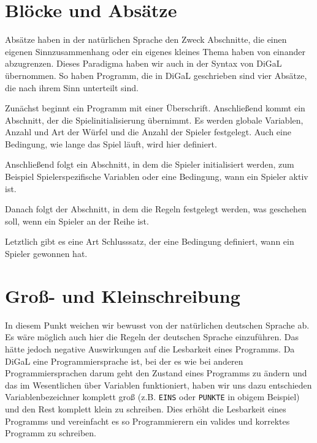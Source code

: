     \section{Blöcke und Absätze}
    \label{sec:blocke_und_absatze}
     Absätze haben in der natürlichen Sprache den Zweck Abschnitte, die einen eigenen Sinnzusammenhang oder ein eigenes kleines Thema haben von einander abzugrenzen. Dieses Paradigma haben wir auch in der Syntax von DiGaL übernommen. So haben Programm, die in DiGaL geschrieben sind vier Absätze, die nach ihrem Sinn unterteilt sind.
 
     Zunächst beginnt ein Programm mit einer Überschrift. Anschließend kommt ein Abschnitt, der die Spielinitialisierung übernimmt. Es werden globale Variablen, Anzahl und Art der Würfel und die Anzahl der Spieler festgelegt. Auch eine Bedingung, wie lange das Spiel läuft, wird hier definiert.
 
     Anschließend folgt ein Abschnitt, in dem die Spieler initialisiert werden, zum Beispiel Spielerspezifische Variablen oder eine Bedingung, wann ein Spieler aktiv ist.
 
     Danach folgt der Abschnitt, in dem die Regeln festgelegt werden, was geschehen soll, wenn ein Spieler an der Reihe ist.
 
     Letztlich gibt es eine Art Schlusssatz, der eine Bedingung definiert, wann ein Spieler gewonnen hat.
 
    \section{Groß- und Kleinschreibung}
    \label{sec:gross_und_kleinschreibung}
     In diesem Punkt weichen wir bewusst von der natürlichen deutschen Sprache ab. Es wäre möglich auch hier die Regeln der deutschen Sprache einzuführen. Das hätte jedoch negative Auswirkungen auf die Lesbarkeit eines Programms. Da DiGaL eine Programmiersprache ist, bei der es wie bei anderen Programmiersprachen darum geht den Zustand eines Programms zu ändern und das im Wesentlichen über Variablen funktioniert, haben wir uns dazu entschieden Variablenbezeichner komplett groß (z.B. \texttt{EINS} oder \texttt{PUNKTE} in obigem Beispiel) und den Rest komplett klein zu schreiben. Dies erhöht die Lesbarkeit eines Programms und vereinfacht es so Programmierern ein valides und korrektes Programm zu schreiben.
	
    

